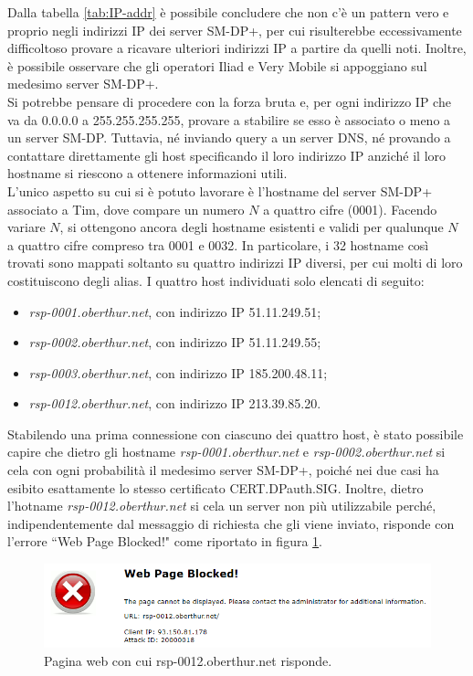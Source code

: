 \documentclass[10pt, oneside]{book}
\begin{document}
Dalla tabella \ref{tab:IP-addr} è possibile concludere che non c'è un pattern vero e proprio negli indirizzi IP dei server SM-DP+, per cui risulterebbe eccessivamente difficoltoso provare a ricavare ulteriori indirizzi IP a partire da quelli noti. Inoltre, è possibile osservare che gli operatori Iliad e Very Mobile si appoggiano sul medesimo server SM-DP+.\\
Si potrebbe pensare di procedere con la forza bruta e, per ogni indirizzo IP che va da 0.0.0.0 a 255.255.255.255, provare a stabilire se esso è associato o meno a un server SM-DP. Tuttavia, né inviando query a un server DNS, né provando a contattare direttamente gli host specificando il loro indirizzo IP anziché il loro hostname si riescono a ottenere informazioni utili.\\
L'unico aspetto su cui si è potuto lavorare è l'hostname del server SM-DP+ associato a Tim, dove compare un numero $N$ a quattro cifre (0001). Facendo variare $N$, si ottengono ancora degli hostname esistenti e validi per qualunque $N$ a quattro cifre compreso tra 0001 e 0032. In particolare, i 32 hostname così trovati sono mappati soltanto su quattro indirizzi IP diversi, per cui molti di loro costituiscono degli alias. I quattro host individuati solo elencati di seguito:
\begin{itemize}
\item \textit{rsp-0001.oberthur.net}, con indirizzo IP 51.11.249.51;
\item \textit{rsp-0002.oberthur.net}, con indirizzo IP 51.11.249.55;
\item \textit{rsp-0003.oberthur.net}, con indirizzo IP 185.200.48.11;
\item \textit{rsp-0012.oberthur.net}, con indirizzo IP 213.39.85.20.
\end{itemize}
Stabilendo una prima connessione con ciascuno dei quattro host, è stato possibile capire che dietro gli hostname \textit{rsp-0001.oberthur.net} e \textit{rsp-0002.oberthur.net} si cela con ogni probabilità il medesimo server SM-DP+, poiché nei due casi ha esibito esattamente lo stesso certificato CERT.DPauth.SIG. Inoltre, dietro l'hotname \textit{rsp-0012.oberthur.net} si cela un server non più utilizzabile perché, indipendentemente dal messaggio di richiesta che gli viene inviato, risponde con l'errore ``Web Page Blocked!" come riportato in figura \ref{fig:web-page-blocked}.\\
\begin{figure}
\includegraphics[width=\linewidth]{web-page-blocked.png}
\caption{Pagina web con cui rsp-0012.oberthur.net risponde.}
\label{fig:web-page-blocked}
\end{figure}
\end{document}
